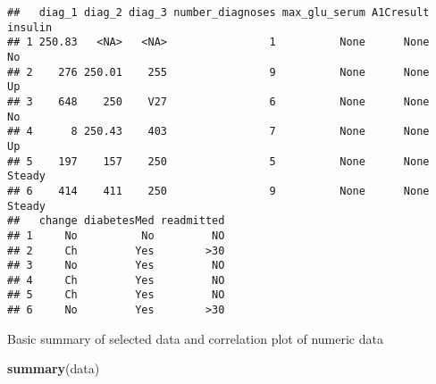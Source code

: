 \documentclass[]{article}
\newenvironment{Shaded}{\begin{snugshade}}{\end{snugshade}}
\newcommand{\KeywordTok}[1]{\textcolor[rgb]{0.13,0.29,0.53}{\textbf{#1}}}
\newcommand{\NormalTok}[1]{#1}
\begin{document}
\begin{verbatim}
##   diag_1 diag_2 diag_3 number_diagnoses max_glu_serum A1Cresult insulin
## 1 250.83   <NA>   <NA>                1          None      None      No
## 2    276 250.01    255                9          None      None      Up
## 3    648    250    V27                6          None      None      No
## 4      8 250.43    403                7          None      None      Up
## 5    197    157    250                5          None      None  Steady
## 6    414    411    250                9          None      None  Steady
##   change diabetesMed readmitted
## 1     No          No         NO
## 2     Ch         Yes        >30
## 3     No         Yes         NO
## 4     Ch         Yes         NO
## 5     Ch         Yes         NO
## 6     No         Yes        >30
\end{verbatim}

Basic summary of selected data and correlation plot of numeric data

\begin{Shaded}
\begin{Highlighting}[]
\KeywordTok{summary}\NormalTok{(data)}
\end{Highlighting}
\end{Shaded}
\end{document}
